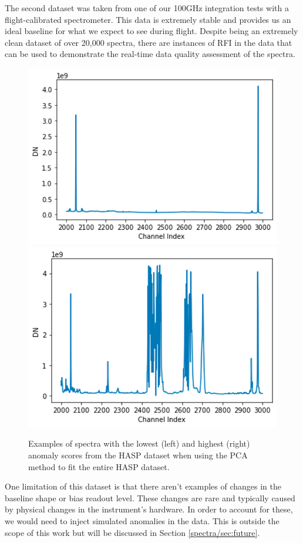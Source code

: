 The second dataset was taken from one of our 100GHz integration tests with a flight-calibrated spectrometer. 
This data is extremely stable and provides us an ideal baseline for what we expect to see during flight.
Despite being an extremely clean dataset of over 20,000 spectra, there are instances of RFI in the data that can be used to demonstrate the real-time data quality assessment of the spectra. 

\begin{figure}
    \centering
    \includegraphics[width=0.49\linewidth]{figs/spectra/hasp1.png}
    \includegraphics[width=0.49\linewidth]{figs/spectra/hasp2.png}
    \caption[The Least and Most Novel Spectra in the HASP Data]{Examples of spectra with the lowest (left) and highest (right) anomaly scores from the HASP dataset when using the PCA method to fit the entire HASP dataset.}
    \label{spectra/fig:hasp}
\end{figure}

One limitation of this dataset is that there aren't examples of changes in the baseline shape or bias readout level. 
These changes are rare and typically caused by physical changes in the instrument's hardware. 
In order to account for these, we would need to inject simulated anomalies in the data.
This is outside the scope of this work but will be discussed in Section \ref{spectra/sec:future}.

